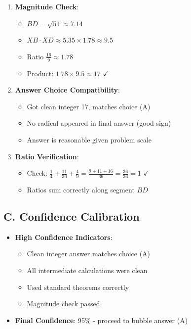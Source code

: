 \documentclass[]{article}
\begin{document}
\begin{verificationbox}
\begin{enumerate}[leftmargin=*]
    \item \textbf{Magnitude Check}:
    \begin{itemize}
        \item $BD = \sqrt{51} \approx 7.14$
        \item $XB \cdot XD \approx 5.35 \times 1.78 \approx 9.5$
        \item Ratio $\frac{16}{9} \approx 1.78$
        \item Product: $1.78 \times 9.5 \approx 17$ $\checkmark$
    \end{itemize}
    
    \item \textbf{Answer Choice Compatibility}:
    \begin{itemize}
        \item Got clean integer 17, matches choice (A)
        \item No radical appeared in final answer (good sign)
        \item Answer is reasonable given problem scale
    \end{itemize}
    
    \item \textbf{Ratio Verification}:
    \begin{itemize}
        \item Check: $\frac{1}{4} + \frac{11}{36} + \frac{4}{9} = \frac{9 + 11 + 16}{36} = \frac{36}{36} = 1$ $\checkmark$
        \item Ratios sum correctly along segment $BD$
    \end{itemize}
\end{enumerate}

\subsection*{C. Confidence Calibration}
\begin{itemize}[leftmargin=*]
    \item \textbf{High Confidence Indicators}:
    \begin{itemize}
        \item Clean integer answer matches choice (A)
        \item All intermediate calculations were clean
        \item Used standard theorems correctly
        \item Magnitude check passed
    \end{itemize}
    
    \item \textbf{Final Confidence}: 95\% - proceed to bubble answer (A)
\end{itemize}
\end{verificationbox}
\end{document}

